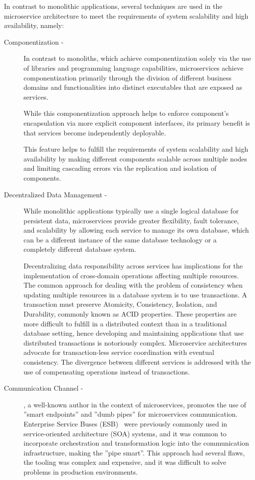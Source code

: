 In contrast to monolithic applications, several techniques are used in the microservice architecture to meet the requirements of system scalability and high availability, namely:
\begin{description}
    \item [Componentization -] In contrast to monoliths, which achieve componentization solely via the use of libraries and programming language capabilities,
    microservices achieve componentization primarily through the division of different business domains and functionalities into distinct executables
    that are exposed as services.

    While this componentization approach helps to enforce component's encapsulation via more explicit component interfaces,
    its primary benefit is that services become independently deployable.

    This feature helps to fulfill the requirements of system scalability and high availability by
    making different components scalable across multiple nodes and limiting cascading errors via the replication and isolation of components.
    \item[Decentralized Data Management -] While monolithic applications typically use a single logical database for persistent data, microservices provide greater flexibility, fault tolerance,
    and scalability by allowing each service to manage its own database, which can be a different instance of the same database technology or a completely different database system.

    Decentralizing data responsibility across services has implications for the implementation of cross-domain operations affecting multiple resources.
    The common approach for dealing with the problem of consistency when updating multiple resources in a database system is to use transactions.
    A transaction must preserve Atomicity, Consistency, Isolation, and Durability, commonly known as ACID properties.
    These properties are more difficult to fulfill in a distributed context than in a traditional database setting, hence developing and maintaining applications that use distributed transactions is notoriously complex.
    Microservice architectures advocate for transaction-less service coordination with eventual consistency.
    The divergence between different services is addressed with the use of compensating operations instead of transactions.
    \item[Communication Channel -] \citeauthor{microservices}, a well-known author in the context of microservices, promotes the use of ''smart endpoints'' and ''dumb pipes'' for microservices communication.
    Enterprise Service Buses (ESB)~\cite{esb} were previously commonly used in service-oriented architecture (SOA) systems,
    and it was common to incorporate orchestration and transformation logic into the communication infrastructure,
    making the ''pipe smart''.
    This approach had several flaws, the tooling was complex and expensive, and it was difficult to solve problems in production environments.


\end{description}
